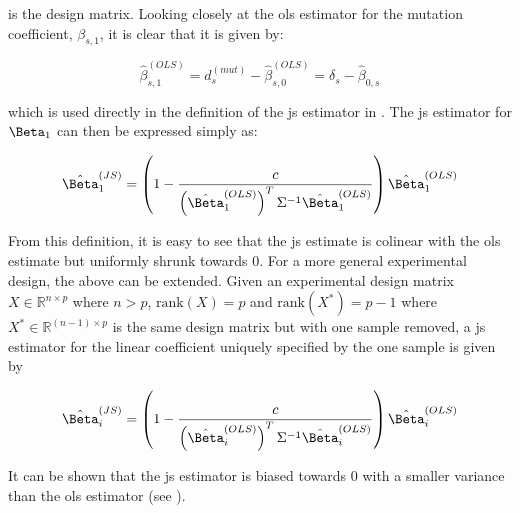 is the design matrix.
Looking closely at the \gls{ols} estimator for the mutation coefficient, $\beta_{s,1}$, it is clear that it is given by:

\begin{equation}
  \hat{\beta}_{s,1}^{(OLS)} = d_s^{(mut)} - \hat{\beta}_{s,0}^{(OLS)} = \delta_s - \hat{\beta}_{0,s}
\end{equation}

which is used directly in the definition of the \gls{js} estimator in .
The \gls{js} estimator for $\Beta_1$ can then be expressed simply as:

\begin{equation}
  \hat{\Beta}_1^{(JS)} = \left( 1 - \frac{c}{\left( \hat{\Beta}_1^{(OLS)} \right)^T \Sigma^{-1} \hat{\Beta}_1^{(OLS)}} \right) \hat{\Beta}_1^{(OLS)}
  \label{eqn:js_defn_ols}
\end{equation}

From this definition, it is easy to see that the \gls{js} estimate is colinear with the \gls{ols} estimate but uniformly shrunk towards 0.
For a more general experimental design, the above can be extended.
Given an experimental design matrix $X \in \mathbb{R}^{n \times p}$ where $n > p$, $\text{rank}(X) = p$ and $\text{rank}(X^*) = p - 1$ where $X^* \in \mathbb{R}^{(n - 1) \times p}$ is the same design matrix but with one sample removed, a \gls{js} estimator for the linear coefficient uniquely specified by the one sample is given by

\begin{equation*}
  \hat{\Beta}_i^{(JS)} = \left( 1 - \frac{c}{\left( \hat{\Beta}_i^{(OLS)} \right)^T \Sigma^{-1} \hat{\Beta}_i^{(OLS)}} \right) \hat{\Beta}_i^{(OLS)}
\end{equation*}

It can be shown that the \gls{js} estimator is biased towards 0 with a smaller variance than the \gls{ols} estimator (see ).


